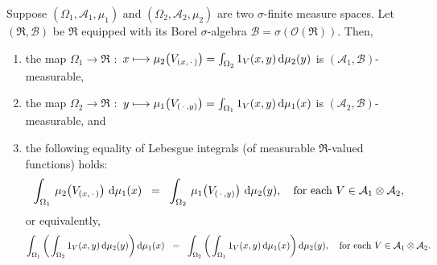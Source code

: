 \begin{theorem}
\mbox{}\vskip0.1cm\noindent
Suppose
$\left(\Omega_{1},\mathcal{A}_{1},\mu_{1}\right)$ and $\left(\Omega_{2},\mathcal{A}_{2},\mu_{2}\right)$
are two $\sigma$-finite measure spaces.
Let $\left(\Re,\mathcal{B}\right)$ be $\Re$ equipped with its Borel $\sigma$-algebra
$\mathcal{B} = \sigma\!\left(\mathcal{O}(\Re)\right)$.
Then,
\begin{enumerate}
\item	the map\;
		$\Omega_{1} \longrightarrow \Re$ $:$
		$x \longmapsto \mu_{2}\!\left(V_{(x,\,\cdot\,)}\right) = \int_{\Omega_{2}}1_{V}(x,y)\,\textnormal{d}\mu_{2}(y)$
		\;is $(\mathcal{A}_{1},\mathcal{B})$-measurable,
\item	the map\;
		$\Omega_{2} \longrightarrow \Re$ $:$
		$y \longmapsto \mu_{1}\!\left(V_{(\,\cdot\,,y)}\right) = \int_{\Omega_{1}}1_{V}(x,y)\,\textnormal{d}\mu_{1}(x)$
		\;is $(\mathcal{A}_{2},\mathcal{B})$-measurable, and
\item	the following equality of Lebesgue integrals (of measurable $\Re$-valued functions) holds:
		\begin{equation*}
		\int_{\Omega_{1}}\, \mu_{2}\!\left(V_{(x,\,\cdot\,)}\right) \,\textnormal{d}\mu_{1}(x)
		\;\; = \;\;
		\int_{\Omega_{2}}\, \mu_{1}\!\left(V_{(\,\cdot\,,y)}\right) \,\textnormal{d}\mu_{2}(y),
		\quad
		\textnormal{for each $V \in \mathcal{A}_{1} \otimes \mathcal{A}_{2}$},
		\end{equation*}
		or equivalently,
		\begin{equation*}
		\int_{\Omega_{1}} \left(\, \int_{\Omega_{2}} 1_{V}(x,y) \,\textnormal{d}\mu_{2}(y) \right) \textnormal{d}\mu_{1}(x)
		\;\; = \;\;
		\int_{\Omega_{2}} \left(\, \int_{\Omega_{1}} 1_{V}(x,y) \,\textnormal{d}\mu_{1}(x) \right) \textnormal{d}\mu_{2}(y),
		\quad
		\textnormal{for each $V \in \mathcal{A}_{1} \otimes \mathcal{A}_{2}$}.
		\end{equation*}
\end{enumerate}
\end{theorem}


\renewcommand{\theenumi}{\roman{enumi}}
\renewcommand{\labelenumi}{\textnormal{(\theenumi)}$\;\;$}

